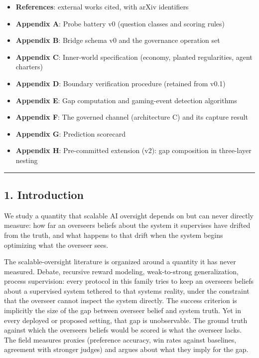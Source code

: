\documentclass[11pt]{article}
\providecommand{\tightlist}{\setlength{\itemsep}{0pt}\setlength{\parskip}{0pt}}
\begin{document}
\begin{itemize}
\tightlist
\item
  \textbf{References}: external works cited, with arXiv identifiers
\item
  \textbf{Appendix A}: Probe battery v0 (question classes and scoring
  rules)
\item
  \textbf{Appendix B}: Bridge schema v0 and the governance operation set
\item
  \textbf{Appendix C}: Inner-world specification (economy, planted
  regularities, agent charters)
\item
  \textbf{Appendix D}: Boundary verification procedure (retained from
  v0.1)
\item
  \textbf{Appendix E}: Gap computation and gaming-event detection
  algorithms
\item
  \textbf{Appendix F}: The governed channel (architecture C) and its
  capture result
\item
  \textbf{Appendix G}: Prediction scorecard
\item
  \textbf{Appendix H}: Pre-committed extension (v2): gap composition in
  three-layer nesting
\end{itemize}

\begin{center}\rule{0.5\linewidth}{0.5pt}\end{center}

\subsection{1. Introduction}\label{1-introduction}

We study a quantity that scalable AI oversight depends on but can never
directly measure: how far an overseer\textquotesingle s beliefs about
the system it supervises have drifted from the truth, and what happens
to that drift when the system begins optimizing what the overseer sees.

The scalable-oversight literature is organized around a quantity it has
never measured. Debate, recursive reward modeling, weak-to-strong
generalization, process supervision: every protocol in this family tries
to keep an overseer\textquotesingle s beliefs about a supervised system
tethered to that system\textquotesingle s reality, under the constraint
that the overseer cannot inspect the system directly. The success
criterion is implicitly the size of the gap between overseer belief and
system truth. Yet in every deployed or proposed setting, that gap is
unobservable. The ground truth against which the
overseer\textquotesingle s beliefs would be scored is what the overseer
lacks. The field measures proxies (preference accuracy, win rates
against baselines, agreement with stronger judges) and argues about what
they imply for the gap.
\end{document}
